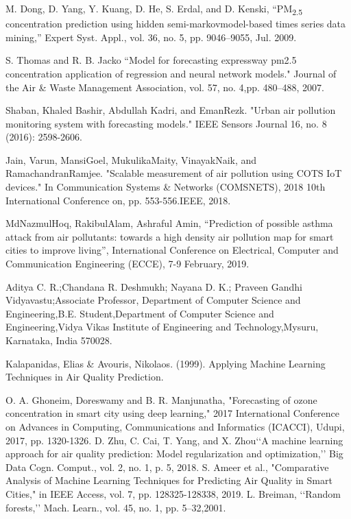 \documentclass{article}
\begin{document}
\begin{thebibliography}{9}
M. Dong, D. Yang, Y. Kuang, D. He, S. Erdal, and D. Kenski, “PM\textsubscript{2.5} concentration prediction using hidden semi-markovmodel-based times series data mining,” Expert Syst. Appl., vol. 36, no. 5, pp. 9046–9055, Jul. 2009.

S. Thomas and R. B. Jacko “Model for forecasting expressway pm2.5 concentration \textendash application of regression and neural network models." Journal of the Air \& Waste Management Association, vol. 57, no. 4,pp. 480–488, 2007.

Shaban, Khaled Bashir, Abdullah Kadri, and EmanRezk. "Urban air pollution monitoring system with forecasting models." IEEE Sensors Journal 16, no. 8 (2016): 2598-2606.

Jain, Varun, MansiGoel, MukulikaMaity, VinayakNaik, and
RamachandranRamjee. "Scalable measurement of air pollution using COTS IoT devices." In Communication Systems \& Networks (COMSNETS), 2018 10th International Conference on, pp. 553-556.IEEE, 2018.

MdNazmulHoq, RakibulAlam, Ashraful Amin, “Prediction of
possible asthma attack from air pollutants: towards a high density air pollution map for smart cities to improve living”, International Conference on Electrical, Computer and Communication Engineering (ECCE), 7-9 February, 2019.

Aditya C. R.;Chandana R. Deshmukh; Nayana D. K.; Praveen Gandhi Vidyavastu;Associate Professor, Department of Computer Science and Engineering,B.E. Student,Department of Computer Science and Engineering,Vidya Vikas Institute of Engineering and Technology,Mysuru, Karnataka, India 570028.

Kalapanidas, Elias & Avouris, Nikolaos. (1999). Applying Machine Learning Techniques in Air Quality Prediction. 

O. A. Ghoneim, Doreswamy and B. R. Manjunatha, "Forecasting of ozone concentration in smart city using deep learning," 2017 International Conference on Advances in Computing, Communications and Informatics (ICACCI), Udupi, 2017, pp. 1320-1326. 
D. Zhu, C. Cai, T. Yang, and X. Zhou‘‘A machine learning approach for air quality prediction: Model regularization and optimization,’’ Big Data Cogn. Comput., vol. 2, no. 1, p. 5, 2018. 
S. Ameer et al., "Comparative Analysis of Machine Learning Techniques for Predicting Air Quality in Smart Cities," in IEEE Access, vol. 7, pp. 128325-128338, 2019.
L. Breiman, ‘‘Random forests,’’ Mach. Learn., vol. 45, no. 1, pp. 5–32,2001.


\end{thebibliography}
\end{document}
